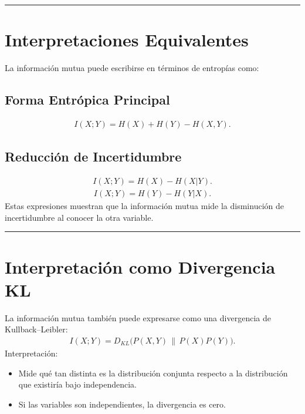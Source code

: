 \documentclass[letterpaper,10pt,english]{jupyterBook}
\begin{document}
\bigskip\hrule\bigskip



\section{Interpretaciones Equivalentes}
\label{\detokenize{01_theory/mutual_information:interpretaciones-equivalentes}}
\sphinxAtStartPar
La información mutua puede escribirse en términos de entropías como:


\subsection{Forma Entrópica Principal}
\label{\detokenize{01_theory/mutual_information:forma-entropica-principal}}\begin{equation*}
\begin{split}
I(X;Y)=H(X)+H(Y)-H(X,Y).
\end{split}
\end{equation*}

\subsection{Reducción de Incertidumbre}
\label{\detokenize{01_theory/mutual_information:reduccion-de-incertidumbre}}\begin{equation*}
\begin{split}
I(X;Y)=H(X)-H(X|Y).
\end{split}
\end{equation*}\begin{equation*}
\begin{split}
I(X;Y)=H(Y)-H(Y|X).
\end{split}
\end{equation*}
\sphinxAtStartPar
Estas expresiones muestran que la información mutua mide la disminución
de incertidumbre al conocer la otra variable.


\bigskip\hrule\bigskip



\section{Interpretación como Divergencia KL}
\label{\detokenize{01_theory/mutual_information:interpretacion-como-divergencia-kl}}
\sphinxAtStartPar
La información mutua también puede expresarse como una divergencia
de Kullback–Leibler:
\begin{equation*}
\begin{split}
I(X;Y)=D_{KL}\big(P(X,Y)\,\|\,P(X)P(Y)\big).
\end{split}
\end{equation*}
\sphinxAtStartPar
Interpretación:
\begin{itemize}
\item {} 
\sphinxAtStartPar
Mide qué tan distinta es la distribución conjunta respecto a la
distribución que existiría bajo independencia.

\item {} 
\sphinxAtStartPar
Si las variables son independientes, la divergencia es cero.

\end{itemize}
\end{document}
